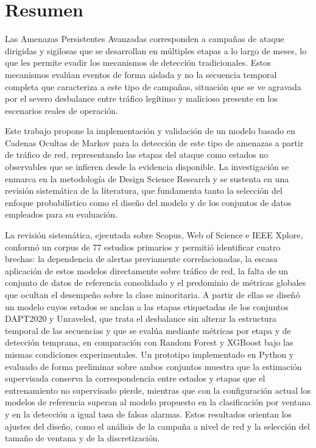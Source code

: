 \chapter*{Resumen}

Las Amenazas Persistentes Avanzadas corresponden a campañas de ataque dirigidas y sigilosas que se desarrollan en múltiples etapas a lo largo de meses, lo que les permite evadir los mecanismos de detección tradicionales. Estos mecanismos evalúan eventos de forma aislada y no la secuencia temporal completa que caracteriza a este tipo de campañas, situación que se ve agravada por el severo desbalance entre tráfico legítimo y malicioso presente en los escenarios reales de operación.

Este trabajo propone la implementación y validación de un modelo basado en Cadenas Ocultas de Markov para la detección de este tipo de amenazas a partir de tráfico de red, representando las etapas del ataque como estados no observables que se infieren desde la evidencia disponible. La investigación se enmarca en la metodología de Design Science Research y se sustenta en una revisión sistemática de la literatura, que fundamenta tanto la selección del enfoque probabilístico como el diseño del modelo y de los conjuntos de datos empleados para su evaluación.

La revisión sistemática, ejecutada sobre Scopus, Web of Science e IEEE Xplore, conformó un corpus de 77 estudios primarios y permitió identificar cuatro brechas: la dependencia de alertas previamente correlacionadas, la escasa aplicación de estos modelos directamente sobre tráfico de red, la falta de un conjunto de datos de referencia consolidado y el predominio de métricas globales que ocultan el desempeño sobre la clase minoritaria. A partir de ellas se diseñó un modelo cuyos estados se anclan a las etapas etiquetadas de los conjuntos DAPT2020 y Unraveled, que trata el desbalance sin alterar la estructura temporal de las secuencias y que se evalúa mediante métricas por etapa y de detección temprana, en comparación con Random Forest y XGBoost bajo las mismas condiciones experimentales. Un prototipo implementado en Python y evaluado de forma preliminar sobre ambos conjuntos muestra que la estimación supervisada conserva la correspondencia entre estados y etapas que el entrenamiento no supervisado pierde, mientras que con la configuración actual los modelos de referencia superan al modelo propuesto en la clasificación por ventana y en la detección a igual tasa de falsas alarmas. Estos resultados orientan los ajustes del diseño, como el análisis de la campaña a nivel de red y la selección del tamaño de ventana y de la discretización.

